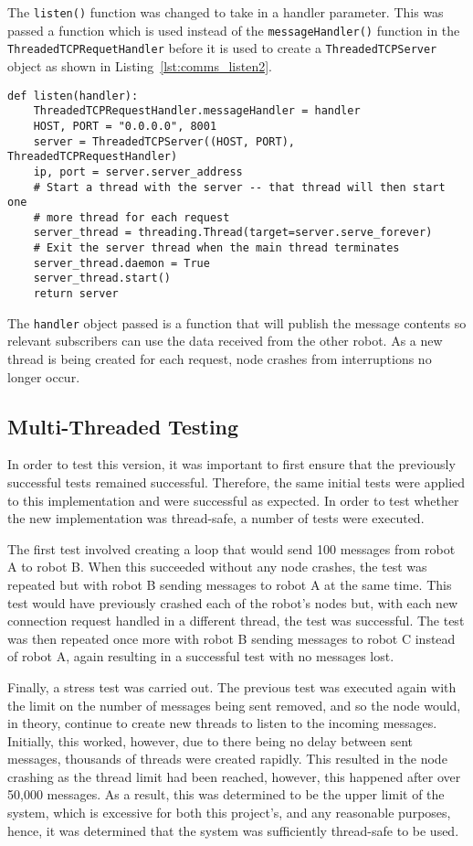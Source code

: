 The \verb|listen()| function was changed to take in a handler parameter. This was
passed a function which is used instead of the \verb|messageHandler()| function in
the \verb|ThreadedTCPRequetHandler| before it is used to create a \verb|ThreadedTCPServer|
object as shown in Listing~\ref{lst:comms_listen2}.

\begin{lstlisting}[caption={listen() Function 2.0}, label={lst:comms_listen2}]
def listen(handler):
    ThreadedTCPRequestHandler.messageHandler = handler
    HOST, PORT = "0.0.0.0", 8001
    server = ThreadedTCPServer((HOST, PORT), ThreadedTCPRequestHandler)
    ip, port = server.server_address
    # Start a thread with the server -- that thread will then start one
    # more thread for each request
    server_thread = threading.Thread(target=server.serve_forever)
    # Exit the server thread when the main thread terminates
    server_thread.daemon = True
    server_thread.start()
    return server
\end{lstlisting}

The \verb|handler| object passed is a function that will publish the message contents so
relevant subscribers can use the data received from the other robot. As a new
thread is being created for each request, node crashes from interruptions no longer occur.

\subsection{Multi-Threaded Testing}\label{soft/comms/mttest}
In order to test this version, it was important to first ensure that the
previously successful tests remained successful. Therefore,
the same initial tests were applied to this implementation and were
successful as expected. In order to test whether the new implementation was
thread-safe, a number of tests were executed.

The first test involved creating a loop that would send 100 messages from robot
A to robot B. When this succeeded without any node crashes, the test was repeated
but with robot B sending messages to robot A at the same time. This test would
have previously crashed each of the robot's nodes but, with each new connection
request handled in a different thread, the test was successful. The test was then
repeated once more with robot B sending messages to robot C instead of robot A,
again resulting in a successful test with no messages lost.

Finally, a stress test was carried out. The previous test was executed again with
the limit on the number of messages being sent removed, and so the node would,
in theory, continue to create new threads to listen to the incoming messages.
Initially, this worked, however, due to there being no delay between sent messages,
thousands of threads were created rapidly. This resulted in the node
crashing as the thread limit had been reached, however, this happened after over
50,000 messages. As a result, this was determined to be the upper limit of the system,
which is excessive for both this project's, and any reasonable purposes, hence, it was
determined that the system was sufficiently thread-safe to be used.

